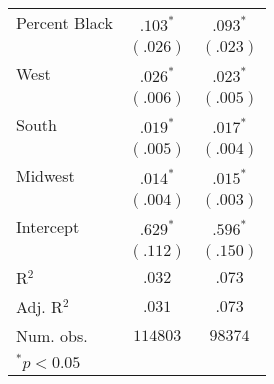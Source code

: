 \begin{tabular}{l c c}
Percent Black                                 & $.103^{*}$  & $.093^{*}$  \\
                                              & $(.026)$    & $(.023)$    \\
West                                          & $.026^{*}$  & $.023^{*}$  \\
                                              & $(.006)$    & $(.005)$    \\
South                                         & $.019^{*}$  & $.017^{*}$  \\
                                              & $(.005)$    & $(.004)$    \\
Midwest                                       & $.014^{*}$  & $.015^{*}$  \\
                                              & $(.004)$    & $(.003)$    \\
Intercept                                     & $.629^{*}$  & $.596^{*}$  \\
                                              & $(.112)$    & $(.150)$    \\
\hline
R$^2$                                         & $.032$      & $.073$      \\
Adj. R$^2$                                    & $.031$      & $.073$      \\
Num. obs.                                     & $114803$    & $98374$     \\
\hline
\multicolumn{3}{l}{\scriptsize{$^{*}p<0.05$}}
\end{tabular}
